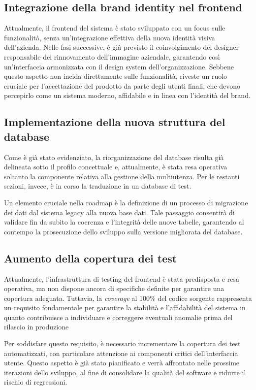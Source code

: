 \subsection{Integrazione della brand identity nel frontend}
Attualmente, il frontend del sistema è stato sviluppato con un focus sulle funzionalità, senza un’integrazione effettiva della nuova identità visiva dell'azienda. Nelle fasi successive, è già previsto il coinvolgimento del designer responsabile del rinnovamento dell'immagine aziendale, garantendo così un'interfaccia armonizzata con il design system dell'organizzazione. Sebbene questo aspetto non incida direttamente sulle funzionalità, riveste un ruolo cruciale per l’accettazione del prodotto da parte degli utenti finali, che devono percepirlo come un sistema moderno, affidabile e in linea con l’identità del brand.

\subsection{Implementazione della nuova struttura del database}
Come è già stato evidenziato, la riorganizzazione del database risulta già delineata sotto il profilo concettuale e, attualmente, è stata resa operativa soltanto la componente relativa alla gestione della multiutenza. Per le restanti sezioni, invece, è in corso la traduzione in un database di test.

Un elemento cruciale nella roadmap è la definizione di un processo di migrazione dei dati dal sistema legacy alla nuova base dati. Tale passaggio consentirà di validare fin da subito la coerenza e l’integrità delle nuove tabelle, garantendo al contempo la prosecuzione dello sviluppo sulla versione migliorata del database.

\subsection{Aumento della copertura dei test}
Attualmente, l’infrastruttura di testing del frontend è stata predisposta e resa operativa, ma non dispone ancora di specifiche definite per garantire una copertura adeguata. Tuttavia, la \textit{coverage} al 100\% del codice sorgente rappresenta un requisito fondamentale per garantire la stabilità e l’affidabilità del sistema in quanto contribuisce a individuare e correggere eventuali anomalie prima del rilascio in produzione

Per soddisfare questo requisito, è necessario incrementare la copertura dei test automatizzati, con particolare attenzione ai componenti critici dell’interfaccia utente. Questo aspetto è già stato pianificato e verrà affrontato nelle prossime iterazioni dello sviluppo, al fine di consolidare la qualità del software e ridurre il rischio di regressioni.

